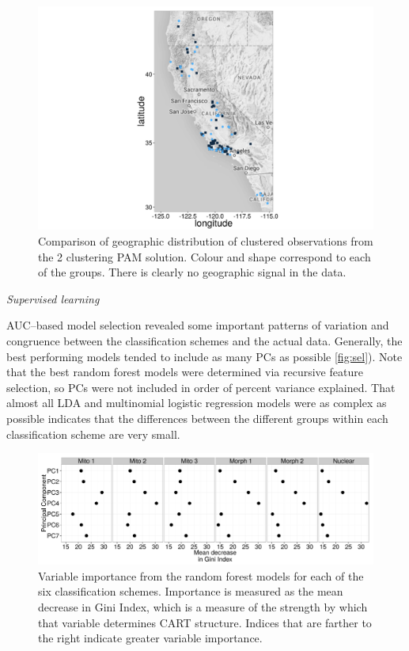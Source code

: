 \documentclass[12pt,letterpaper]{article}
\renewcommand{\subsection}[1]{%
\bigskip
\begin{center}
\begin{large}
\normalfont\itshape #1
\end{large}
\end{center}}
\begin{document}
\begin{figure}[ht]
  \centering
  \includegraphics[height = 0.5\textheight, width = \textwidth, keepaspectratio = true]{figure/gap_map}
  \caption{Comparison of geographic distribution of clustered observations from the 2 clustering PAM solution. Colour and shape correspond to each of the groups. There is clearly no geographic signal in the data.}
  \label{fig:gap_map}
\end{figure}


\subsection{Supervised learning}
AUC--based model selection revealed some important patterns of variation and congruence between the classification schemes and the actual data. Generally, the best performing models tended to include as many PCs as possible \ref{fig:sel}). Note that the best random forest models were determined via recursive feature selection, so PCs were not included in order of percent variance explained. That almost all LDA and multinomial logistic regression models were as complex as possible indicates that the differences between the different groups within each classification scheme are very small.

\begin{figure}[ht]
  \centering
  \includegraphics[height = 0.5\textheight, width = \textwidth, keepaspectratio = true]{figure/var_imp}
  \caption{Variable importance from the random forest models for each of the six classification schemes. Importance is measured as the mean decrease in Gini Index, which is a measure of the strength by which that variable determines CART structure. Indices that are farther to the right indicate greater variable importance.}
  \label{fig:var_imp}
\end{figure}
\end{document}
